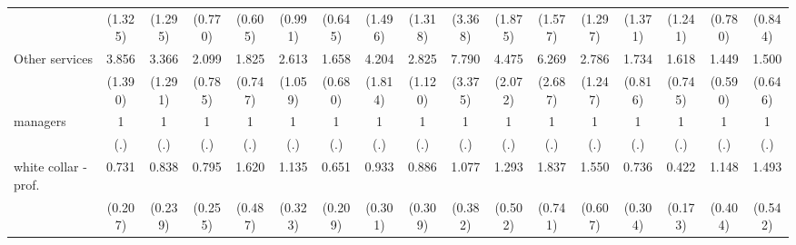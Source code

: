 {\begin{tabular}{l*{16}{c}}
                    &     (1.325)         &     (1.295)         &     (0.770)         &     (0.605)         &     (0.991)         &     (0.645)         &     (1.496)         &     (1.318)         &     (3.368)         &     (1.875)         &     (1.577)         &     (1.297)         &     (1.371)         &     (1.241)         &     (0.780)         &     (0.844)         \\
[1em]
Other services      &       3.856\sym{***}&       3.366\sym{**} &       2.099\sym{*}  &       1.825         &       2.613\sym{*}  &       1.658         &       4.204\sym{***}&       2.825\sym{**} &       7.790\sym{***}&       4.475\sym{**} &       6.269\sym{***}&       2.786\sym{*}  &       1.734         &       1.618         &       1.449         &       1.500         \\
                    &     (1.390)         &     (1.291)         &     (0.785)         &     (0.747)         &     (1.059)         &     (0.680)         &     (1.814)         &     (1.120)         &     (3.375)         &     (2.072)         &     (2.687)         &     (1.247)         &     (0.816)         &     (0.745)         &     (0.590)         &     (0.646)         \\
[1em]
managers            &           1         &           1         &           1         &           1         &           1         &           1         &           1         &           1         &           1         &           1         &           1         &           1         &           1         &           1         &           1         &           1         \\
                    &         (.)         &         (.)         &         (.)         &         (.)         &         (.)         &         (.)         &         (.)         &         (.)         &         (.)         &         (.)         &         (.)         &         (.)         &         (.)         &         (.)         &         (.)         &         (.)         \\
[1em]
white collar - prof.&       0.731         &       0.838         &       0.795         &       1.620         &       1.135         &       0.651         &       0.933         &       0.886         &       1.077         &       1.293         &       1.837         &       1.550         &       0.736         &       0.422\sym{*}  &       1.148         &       1.493         \\
                    &     (0.207)         &     (0.239)         &     (0.255)         &     (0.487)         &     (0.323)         &     (0.209)         &     (0.301)         &     (0.309)         &     (0.382)         &     (0.502)         &     (0.741)         &     (0.607)         &     (0.304)         &     (0.173)         &     (0.404)         &     (0.542)         \\

\end{tabular}}
